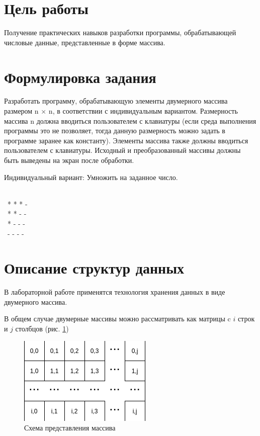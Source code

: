 \documentclass[12pt,a4paper]{article}%
\begin{document}
	\section*{Цель работы}
	
	Получение
	практических
	навыков
	разработки
	программы,
	обрабатывающей числовые данные, представленные в форме массива.
	
	\section*{Формулировка задания}
	
	Разработать
	программу,
	обрабатывающую
	элементы
	двумерного
	массива размером n × n, в соответствии с индивидуальным вариантом.
	Размерность
	массива
	n
	должна
	вводиться
	пользователем с клавиатуры (если среда выполнения программы это не
	позволяет, тогда данную размерность можно задать в программе заранее как
	константу). Элементы массива также должны вводиться пользователем с
	клавиатуры. Исходный и преобразованный массивы должны быть выведены
	на экран после обработки.
	
	Индивидуальный вариант: Умножить на заданное число.
	
	\ \\
	\ * * * -\\
	\ * * - -\\
	\ * - - -\\
	\ - - - -\\
	
	\section*{Описание структур данных}
	
	В лабораторной работе применятся технология хранения данных в виде двумерного массива.
	
	В общем случае двумерные массивы можно рассматривать как матрицы c $i$ строк и $j$ столбцов (рис. \ref{scheme})
	
	\begin{figure}[hpt!]
		\centering
		\includegraphics[width=0.6\linewidth]{scheme}
		\caption{Схема представления массива}
		\label{scheme}
	\end{figure}
	
\end{document}
